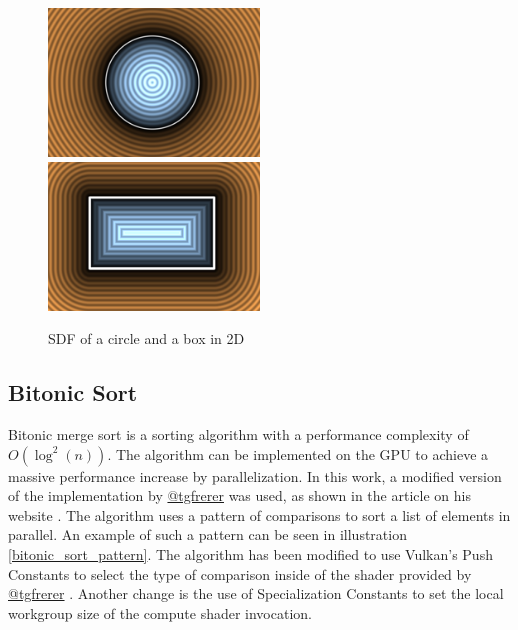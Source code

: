 \documentclass[intern]{cgMA}
\begin{document}
    \begin{figure}[H]
        \includegraphics[width=0.5\textwidth]{figures/gfx00.png}
        \includegraphics[width=0.5\textwidth]{figures/gfx02.png}
        \caption[SDF of a circle and a box in 2D \cite{iquilezles2}]{SDF of a circle and a box in 2D}
        \label{fig:sdf}
    \end{figure}

    \subsection{Bitonic Sort}

    Bitonic merge sort is a sorting algorithm with a performance complexity of $O(\log^2(n))$. The algorithm can be implemented on the GPU to achieve a massive performance increase by parallelization. In this work, a modified version of the implementation by \href{https://twitter.com/tgfrerer}{@tgfrerer} was used, as shown in the article on his website \cite{bitonic}. The algorithm uses a pattern of comparisons to sort a list of elements in parallel. An example of such a pattern can be seen in illustration \ref{bitonic_sort_pattern}. The algorithm has been modified to use Vulkan's Push Constants to select the type of comparison inside of the shader provided by \href{https://twitter.com/tgfrerer}{@tgfrerer} \cite{bitonic}. Another change is the use of Specialization Constants to set the local workgroup size of the compute shader invocation.
\end{document}
